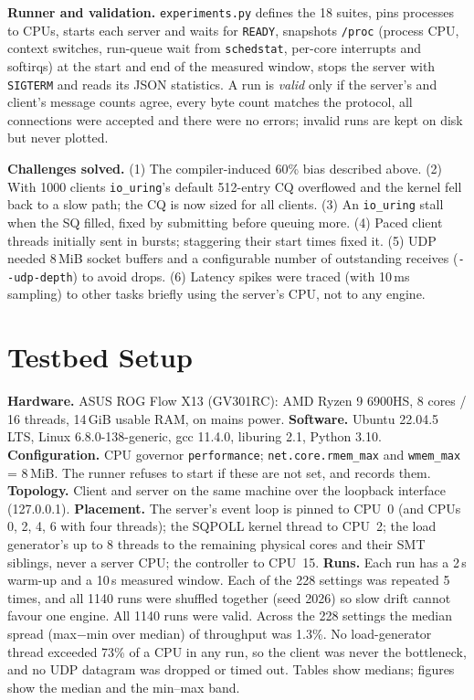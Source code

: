 \documentclass[conference,10pt]{IEEEtran}
\newcommand{\code}[1]{\texttt{#1}}
\begin{document}
\textbf{Runner and validation.} \code{experiments.py} defines the 18 suites, pins processes to CPUs, starts each server and waits for \code{READY}, snapshots \code{/proc} (process CPU, context switches, run-queue wait from \code{schedstat}, per-core interrupts and softirqs) at the start and end of the measured window, stops the server with \code{SIGTERM} and reads its JSON statistics. A run is \emph{valid} only if the server's and client's message counts agree, every byte count matches the protocol, all connections were accepted and there were no errors; invalid runs are kept on disk but never plotted.

\textbf{Challenges solved.}
(1) The compiler-induced 60\% bias described above.
(2) With 1000 clients \code{io\_uring}'s default 512-entry CQ overflowed and the kernel fell back to a slow path; the CQ is now sized for all clients.
(3) An \code{io\_uring} stall when the SQ filled, fixed by submitting before queuing more.
(4) Paced client threads initially sent in bursts; staggering their start times fixed it.
(5) UDP needed 8\,MiB socket buffers and a configurable number of outstanding receives (\code{-{}-udp-depth}) to avoid drops.
(6) Latency spikes were traced (with 10\,ms sampling) to other tasks briefly using the server's CPU, not to any engine.

\section{Testbed Setup}
\textbf{Hardware.} ASUS ROG Flow X13 (GV301RC): AMD Ryzen 9 6900HS, 8 cores / 16 threads, 14\,GiB usable RAM, on mains power.
\textbf{Software.} Ubuntu 22.04.5 LTS, Linux 6.8.0-138-generic, gcc 11.4.0, liburing 2.1, Python 3.10.
\textbf{Configuration.} CPU governor \code{performance}; \code{net.core.rmem\_max} and \code{wmem\_max} = 8\,MiB. The runner refuses to start if these are not set, and records them.
\textbf{Topology.} Client and server on the same machine over the loopback interface (127.0.0.1).
\textbf{Placement.} The server's event loop is pinned to CPU~0 (and CPUs 0, 2, 4, 6 with four threads); the SQPOLL kernel thread to CPU~2; the load generator's up to 8 threads to the remaining physical cores and their SMT siblings, never a server CPU; the controller to CPU~15.
\textbf{Runs.} Each run has a 2\,s warm-up and a 10\,s measured window. Each of the 228 settings was repeated 5 times, and all 1140 runs were shuffled together (seed 2026) so slow drift cannot favour one engine. All 1140 runs were valid. Across the 228 settings the median spread (max$-$min over median) of throughput was 1.3\%. No load-generator thread exceeded 73\% of a CPU in any run, so the client was never the bottleneck, and no UDP datagram was dropped or timed out. Tables show medians; figures show the median and the min--max band.
\end{document}
